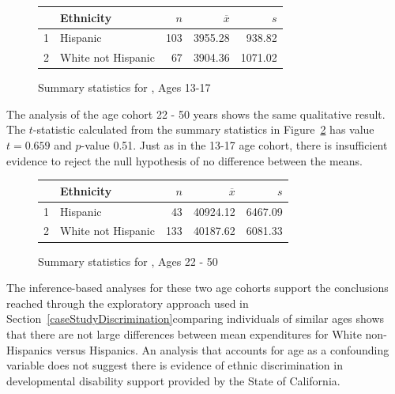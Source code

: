 \begin{figure}[h]
  \centering
  \begin{tabular}{rlrrr}  \hline
& Ethnicity & $n$ & $\overline{x}$ & $s$ \\   \hline
1 & Hispanic & 103 & 3955.28 & 938.82 \\ 
2 & White not Hispanic &  67 & 3904.36 & 1071.02 \\    
\hline
\end{tabular}
\caption{Summary statistics for , Ages 13-17}
\label{ddsExpenditureSummaryByEthnicityAge13Table}
\end{figure}

The analysis of the age cohort 22 - 50 years shows the same qualitative result. The $t$-statistic calculated from the summary statistics in Figure~\ref{ddsExpEthnicityAge22Table} has value $t = 0.659$ and $p$-value 0.51. Just as in the 13-17 age cohort, there is insufficient evidence to reject the null hypothesis of no difference between the means.

\begin{figure}[h]
\centering
\begin{tabular}{rlrrr}
  \hline
 & Ethnicity & $n$ & $\overline{x}$ & $s$ \\ 
  \hline
1 & Hispanic &  43 & 40924.12 & 6467.09 \\ 
  2 & White not Hispanic & 133 & 40187.62 & 6081.33 \\ 
   \hline
\end{tabular}
\caption{Summary statistics for , Ages 22 - 50} 
\label{ddsExpEthnicityAge22Table}
\end{figure}

The inference-based analyses for these two age cohorts support the conclusions reached through the exploratory approach used in Section~\ref{caseStudyDiscrimination}\textemdash comparing individuals of similar ages shows that there are not large differences between mean expenditures for White non-Hispanics versus Hispanics. An analysis that accounts for age as a confounding variable does not suggest there is evidence of ethnic discrimination in developmental disability support provided by the State of California.

